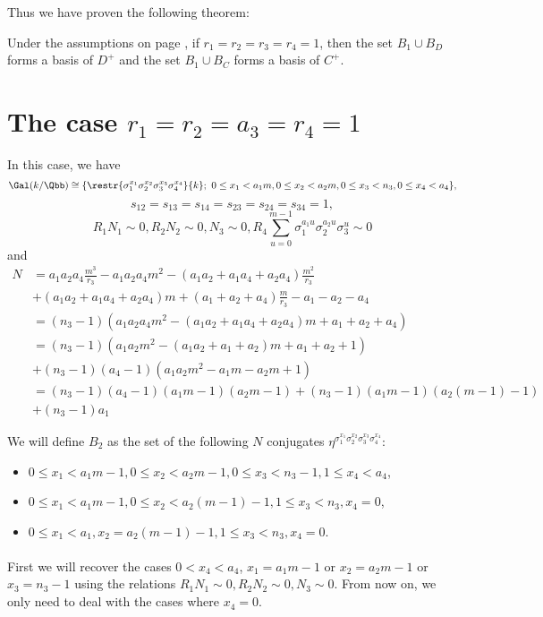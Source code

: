 Thus we have proven the following theorem:
\begin{theorem}
Under the assumptions on page \pageref{assum}, if $r_1=r_2=r_3=r_4=1$, then the set $B_{1}\cup B_D$ forms a basis of $D^+$ and the set $B_{1}\cup B_C$ forms a basis of $C^+$.
\end{theorem}
\section{The case $r_1=r_2=a_3=r_4=1$}
In this case, we have
$$\Gal(k/\Qbb)\cong
 \{\restr{\sigma_1^{x_1}\sigma_2^{x_2}\sigma_3^{x_3}\sigma_4^{x_4}}{k};~  0\leq x_1<a_1m, 0\leq x_2<a_2m, 0\leq x_3<n_3,0\leq x_4<a_4\},$$
  $$s_{12}=s_{13}=s_{14}=s_{23}=s_{24}=s_{34}=1,$$
$$R_1N_1\sim 0, R_2N_2\sim 0, N_3 \sim 0, R_4 \sum_{u=0}^{m-1}\sigma_1^{a_1u}\sigma_2^{a_2u}\sigma_3^{u} \sim 0$$
and
\begin{align*}
N&=a_1a_2a_4\frac{m^3}{r_3}-a_1a_2a_4m^2-(a_1a_2+a_1a_4+a_2a_4)\frac{m^2}{r_3}\\
&+(a_1a_2+a_1a_4+a_2a_4)m+(a_1+a_2+a_4)\frac{m}{r_3}-a_1-a_2-a_4\\
&=(n_3-1)(a_1a_2a_4m^2-(a_1a_2+a_1a_4+a_2a_4)m+a_1+a_2+a_4)\\
&=(n_3-1)(a_1a_2m^2-(a_1a_2+a_1+a_2)m+a_1+a_2+1)\\
&+(n_3-1)(a_4-1)(a_1a_2m^2-a_1m-a_2m+1)\\
&=(n_3-1)(a_4-1)(a_1m-1)(a_2m-1)+(n_3-1)(a_1m-1)(a_2(m-1)-1)\\
&+(n_3-1)a_1
\end{align*}

We will define $B_2$ as the set of the following $N$ conjugates $\eta^{\sigma_1^{x_1}\sigma_2^{x_2}\sigma_3^{x_3}\sigma_4^{x_4}}$:
\begin{itemize}
\item $0\le x_1 <a_1m-1, 0\le x_2 < a_2m-1, 0 \le x_3<n_3-1, 1\le x_4<a_4$,
\item $0\le x_1 < a_1m-1, 0\le x_2 < a_2(m-1)-1, 1\leq x_3 < n_3, x_4=0$,
\item $0\le x_1 < a_1, x_2=a_2(m-1)-1, 1\leq x_3 < n_3, x_4=0$.
\end{itemize}
\paragraph*{}
First we will recover the cases $0<x_4<a_4$, $x_1=a_1m-1$ or $x_2=a_2m-1$ or $x_3=n_3-1$ using the relations $R_1N_1\sim 0, R_2N_2\sim 0, N_3\sim 0$. From now on, we only need to deal with the cases where $x_4=0$.
